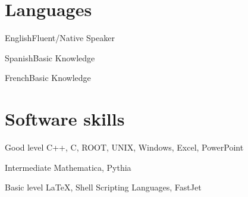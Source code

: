 \documentclass[15pt]{tccv}
\begin{document}
\section{Languages} 

\begin{factlist}
\item{English}{Fluent/Native Speaker}
\item{Spanish}{Basic Knowledge}
\item{French}{Basic Knowledge}
\end{factlist}




\section{Software skills}

\begin{factlist}

\item{Good level}
     {C++, C, ROOT, UNIX, Windows, Excel, PowerPoint}

\item{Intermediate}
     {Mathematica, Pythia}

\item{Basic level}
     {\LaTeX, Shell Scripting Languages, FastJet}

\end{factlist}
\end{document}
